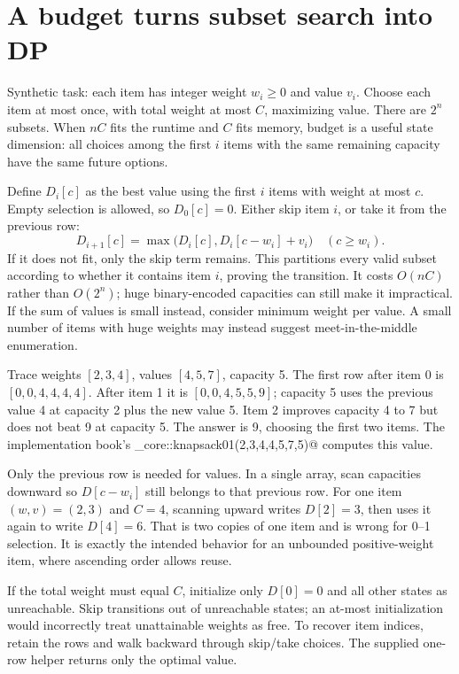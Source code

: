 \section{A budget turns subset search into DP}
\label{case:knapsack}
Synthetic task: each item has integer weight $w_i\ge0$ and value $v_i$.
Choose each item at most once, with total weight at most $C$, maximizing
value. There are $2^n$ subsets. When $nC$ fits the runtime and $C$ fits
memory, budget is a useful state dimension: all choices among the first $i$
items with the same remaining capacity have the same future options.

Define $D_i[c]$ as the best value using the first $i$ items with weight at
most $c$. Empty selection is allowed, so $D_0[c]=0$. Either skip item $i$,
or take it from the previous row:
\[
 D_{i+1}[c]=\max\bigl(D_i[c],D_i[c-w_i]+v_i\bigr)
 \quad(c\ge w_i).
\]
If it does not fit, only the skip term remains. This partitions every valid
subset according to whether it contains item $i$, proving the transition.
It costs $O(nC)$ rather than $O(2^n)$; huge binary-encoded capacities can
still make it impractical. If the sum of values is small instead, consider
minimum weight per value. A small number of items with huge weights may
instead suggest meet-in-the-middle enumeration.

Trace weights $[2,3,4]$, values $[4,5,7]$, capacity 5. The first row after
item 0 is $[0,0,4,4,4,4]$. After item 1 it is $[0,0,4,5,5,9]$; capacity 5
uses the previous value 4 at capacity 2 plus the new value 5. Item 2 improves
capacity 4 to 7 but does not beat 9 at capacity 5. The answer is 9, choosing
the first two items. The implementation book's
\verb@finals_core::knapsack01({2,3,4},{4,5,7},5)@ computes this value.

Only the previous row is needed for values. In a single array, scan
capacities downward so $D[c-w_i]$ still belongs to that previous row. For
one item $(w,v)=(2,3)$ and $C=4$, scanning upward writes $D[2]=3$, then
uses it again to write $D[4]=6$. That is two copies of one item and is wrong
for 0--1 selection. It is exactly the intended behavior for an unbounded
positive-weight item, where ascending order allows reuse.

If the total weight must equal $C$, initialize only $D[0]=0$ and all other
states as unreachable. Skip transitions out of unreachable states; an
at-most initialization would incorrectly treat unattainable weights as free.
To recover item indices, retain the rows and walk backward through skip/take
choices. The supplied one-row helper returns only the optimal value.

